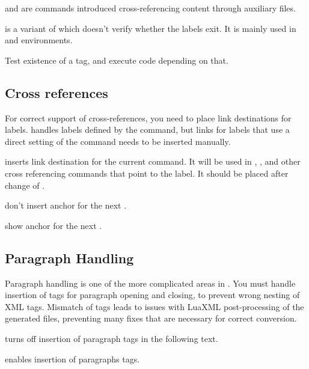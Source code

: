 
 and  are  commands introduced cross-referencing
content through  auxiliary files.

 is a variant of  which doesn't verify whether the
labels exit.  It is mainly used in  and  environments.


Test existence of a tag, and execute code depending on that.


\subsection{Cross references}

For correct support of cross-references, you need to place link destinations for labels.
\texfourht{} handles labels defined by the  command, 
but links for labels that use a direct setting of the  command needs to be 
inserted manually.

 inserts link destination for the current  command. It will be used 
in ,  , and other cross referencing commands that point to the label.
It should be placed after change of . 

 don't insert anchor for the next .

 show anchor for the next .

\subsection{Paragraph Handling}
\label{sec:paragraph_handling}

Paragraph handling is one of the more complicated areas in \texfourht.
You must handle insertion of tags for paragraph opening and closing,
to prevent wrong nesting of XML tags. Mismatch of tags leads to issues with 
LuaXML post-processing of the generated files, preventing many fixes 
that are necessary for correct conversion.

 turns off insertion of paragraph tags in the following text.

 enables insertion of paragraphs tags.

